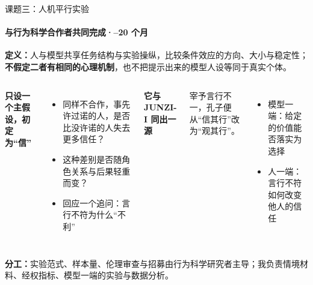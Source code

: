 \documentclass[aspectratio=169,11pt,fontset=fandol]{ctexbeamer}
\newcommand{\hl}[1]{{\bfseries\color{cinnabar}#1}}       %
\newcommand{\hg}[1]{{\bfseries\color{golddeep}#1}}       %
\begin{document}
\begin{frame}[t]{课题三：人机平行实验}
\framesubtitle{与行为科学合作者共同完成\quad·–20 个月}
\vspace{2pt}
\begin{thesis}
\small\textbf{定义：}人与模型共享任务结构与实验操纵，比较条件效应的方向、大小与稳定性；\hl{不假定二者有相同的心理机制}，也不把提示出来的模型人设等同于真实个体。
\end{thesis}
\vspace{2pt}
\begin{columns}[T,onlytextwidth]
{\hg{只设一个主假设，初定为“信”}}
\begin{itemize}\small\setlength{\itemsep}{2pt}
\item 同样不合作，事先许过诺的人，是否比没许诺的人失去更多信任？
\item 这种差别是否随角色关系与后果轻重而变？
\item 回应一个追问：言行不符为什么“不利”
\end{itemize}
{\hg{它与 JUNZI-I 同出一源}}\par\vspace{1pt}
{\small 宰予言行不一，孔子便从“信其行”改为“观其行”。}
\begin{itemize}\small\setlength{\itemsep}{1pt}
\item 模型一端：给定的价值能否落实为选择
\item 人一端：言行不符如何改变他人的信任
\end{itemize}
\end{columns}
\vspace{4pt}
\begin{remark}
\small\textbf{分工：}实验范式、样本量、伦理审查与招募由行为科学研究者主导；我负责情境材料、经权指标、模型一端的实验与数据分析。
\end{remark}
\end{frame}
\end{document}
